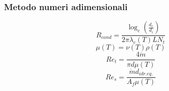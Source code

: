 \documentclass[a4paper,10pt]{article}                                                                                       %
\begin{document}
\subsubsection{Metodo numeri adimensionali}                                                                                 %
\label{subsubsec:adim_num}                                                                                                  %
\begin{equation}                                                                                                            %
  R_{cond} = \frac{\log_e{(\frac{d_e}{d_i})}}{2\pi\lambda_c(T)LN_t}                                                         %
  \label{eqn:cond_r}                                                                                                        %
\end{equation}                                                                                                              %
\begin{equation}                                                                                                            %
  \mu(T) = \nu(T)\rho(T)                                                                                                    %
  \label{eqn:din_vis}                                                                                                       %
\end{equation}                                                                                                              %
\begin{equation}                                                                                                            %
  Re_t = \frac{4\dot{m}}{\pi d\mu(T)}                                                                                       %
  \label{eqn:re_pipe}                                                                                                       %
\end{equation}                                                                                                              %
\begin{equation}                                                                                                            %
  Re_s = \frac{\dot{m}d_{idr.eq.}}{A_f\mu(T)}                                                                               %
  \label{eqn:re_shell}                                                                                                      %
\end{equation}                                                                                                              %
\end{document}
